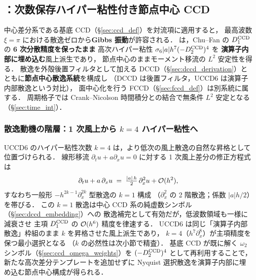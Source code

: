 %
%
\subsection{\texorpdfstring{{\UCCD[6]}：次数保存ハイパー粘性付き節点中心 CCD}{UCCD6：次数保存ハイパー粘性付き節点中心 CCD}}
\label{sec:uccd6_def}

中心差分系である基底 CCD（§\ref{sec:ccd_def}）を対流項に適用すると，
最高波数 $\xi=\pi$ における散逸ゼロから\textbf{Gibbs 振動}が許容される．
{\UCCD[6]} は，Chu--Fan の $D_1^{\mathrm{CCD}}$ の
\textbf{6 次分散精度を保ったまま}
高次ハイパー粘性 $\sigma_6|a|h^7(-D_2^{\mathrm{CCD}})^4$ を
\textbf{演算子内部に埋め込む}風上派生であり，
節点中心のままモーメント移流の $L^2$ 安定性を得る．
散逸を外殻後置フィルタとして加える DCCD（§\ref{sec:dccd_derivation}）と
ともに\textbf{節点中心散逸系統}を構成し
（DCCD は後置フィルタ，UCCD6 は演算子内部散逸という対比），
面中心化を行う FCCD（§\ref{sec:fccd_def}）は別系統に属する．
周期格子では Crank--Nicolson 時間積分との結合で無条件 $L^2$ 安定となる
（§\ref{sec:time_int}）．

\subsubsection{散逸動機の階層：1 次風上から \texorpdfstring{$k=4$}{k=4} ハイパー粘性へ}
\label{sec:uccd6_dissipation_hierarchy}

UCCD6 のハイパー粘性次数 $k=4$ は，より低次の風上散逸の自然な昇格として位置づけられる．
線形移流 $\partial_t u + a\partial_x u = 0$ に対する 1 次風上差分の修正方程式は
\begin{equation}
  \partial_t u + a\,\partial_x u
  \;=\; \tfrac{|a|\,h}{2}\,\partial_x^{2} u + \mathcal{O}(h^{2}),
  \label{eq:uccd6_upwind_modified}
\end{equation}
すなわち一般形 $-h^{2k-1}\partial_x^{2k}$ 型散逸の $k=1$ 構成
（$\partial_x^{2}$ の 2 階散逸；係数 $|a|h/2$）を帯びる．
この $k=1$ 散逸は中心 CCD 系の純虚数シンボル（§\ref{sec:dccd_embedding}）への
散逸補完として有効だが，低波数領域も一様に減衰させ
主項 $D_1^{\mathrm{CCD}}$ の $\mathcal{O}(h^6)$ 精度を律速する．
UCCD6 は同じ「演算子内部散逸」枠組のまま $k$ を昇格させた風上派生であり，
$k=4$（$h^{7}\partial_x^{8}$）が主項精度を保つ最小選択となる
（$k$ の必然性は次小節で精査）．
基底 CCD が既に解く $\omega_2$ シンボル（§\ref{sec:ccd_omega_weights}）を
$(-D_2^{\mathrm{CCD}})^{4}$ として再利用することで，
新たな高次差分テンプレートを追加せずに
Nyquist 選択散逸を演算子内部に埋め込む節点中心構成が得られる．

